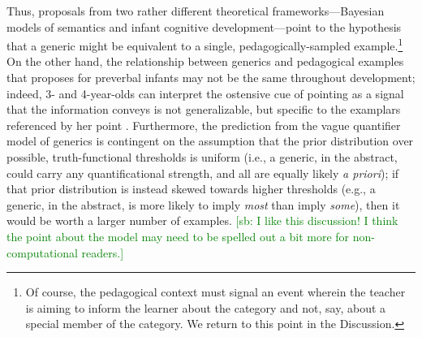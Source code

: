 \documentclass[10pt,letterpaper]{article}
\newcommand{\soph}[1]{\textcolor{Green}{[sb: #1]}}
\begin{document}
Thus, proposals from two rather different theoretical frameworks---Bayesian models of semantics and infant cognitive development---point to the hypothesis that a generic might be equivalent to a single, pedagogically-sampled example.\footnote{Of course, the pedagogical context must signal an event wherein the teacher is aiming to inform the learner about the category and not, say, about a special member of the category. We return to this point in the Discussion.}
On the other hand, the relationship between generics and pedagogical examples that  proposes for preverbal infants may not be the same throughout development; indeed, 3- and 4-year-olds can interpret the ostensive cue of pointing as a signal that the information conveys is not generalizable, but specific to the examplars referenced by her point \cite{meyer2013}.
Furthermore, the prediction from the vague quantifier model of generics is contingent on the assumption that the prior distribution over possible, truth-functional thresholds is uniform (i.e., a generic, in the abstract, could carry any quantificational strength, and all are equally likely \emph{a priori}); if that prior distribution is instead skewed towards higher thresholds (e.g., a generic, in the abstract, is more likely to imply \emph{most} than imply \emph{some}), then it would be worth a larger number of examples. \soph{I like this discussion! I think the point about the model may need to be spelled out a bit more for non-computational readers.}



\end{document}
